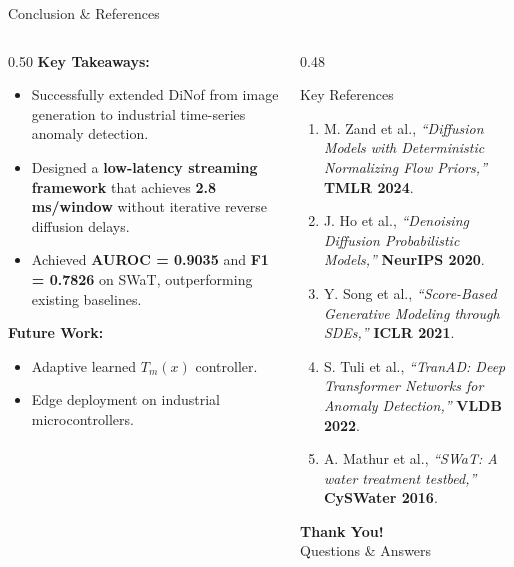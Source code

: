 \documentclass[aspectratio=169, 11pt]{beamer}
\begin{document}
\begin{frame}{Conclusion \& References}
\begin{columns}[T]
  \begin{column}{0.50\textwidth}
    \textbf{\large Key Takeaways:}
    \begin{itemize}\itemsep=4pt
      \item Successfully extended DiNof from image generation to industrial time-series anomaly detection.
      \item Designed a \textbf{low-latency streaming framework} that achieves \textbf{2.8 ms/window} without iterative reverse diffusion delays.
      \item Achieved \textbf{AUROC = 0.9035} and \textbf{F1 = 0.7826} on SWaT, outperforming existing baselines.
    \end{itemize}
    \vspace{6pt}
    \textbf{\large Future Work:}
    \begin{itemize}\itemsep=2pt
      \item Adaptive learned $T_m(x)$ controller.
      \item Edge deployment on industrial microcontrollers.
    \end{itemize}
  \end{column}

  \begin{column}{0.48\textwidth}
    \begin{block}{\footnotesize Key References}
      \scriptsize
      \begin{enumerate}\itemsep=2pt
        \item M. Zand et al., \textit{``Diffusion Models with Deterministic Normalizing Flow Priors,''} \textbf{TMLR 2024}.
        \item J. Ho et al., \textit{``Denoising Diffusion Probabilistic Models,''} \textbf{NeurIPS 2020}.
        \item Y. Song et al., \textit{``Score-Based Generative Modeling through SDEs,''} \textbf{ICLR 2021}.
        \item S. Tuli et al., \textit{``TranAD: Deep Transformer Networks for Anomaly Detection,''} \textbf{VLDB 2022}.
        \item A. Mathur et al., \textit{``SWaT: A water treatment testbed,''} \textbf{CySWater 2016}.
      \end{enumerate}
    \end{block}
    \vspace{6pt}
    \centering \textbf{\large Thank You!} \\[2pt]
    \small Questions \& Answers
  \end{column}
\end{columns}
\end{frame}
\end{document}
